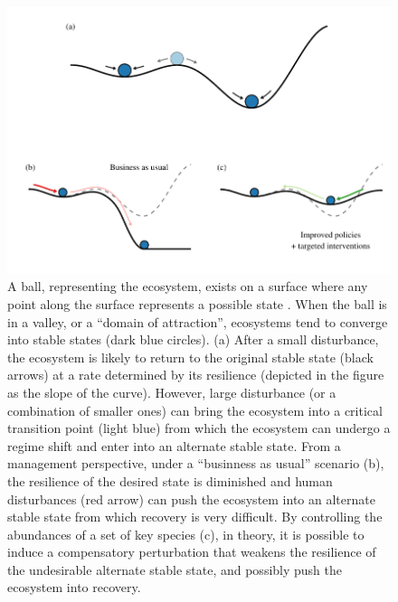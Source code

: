 \documentclass[a4paper]{article}
\begin{document}
\begin{figure}[p]
  \centering
  \includegraphics{critical_tran}
  \caption{
  \label{fig:critical_tran}
  A ball, representing the ecosystem, exists on a surface where any point along the surface represents a possible state \autocite{Holling1995}.
  When the ball is in a valley, or a ``domain of attraction'', ecosystems tend to converge into stable states (dark blue circles).
  (a) After a small disturbance, the ecosystem is likely to return to the original stable state (black arrows) at a rate determined by its resilience (depicted in the figure as the slope of the curve).
  However, large disturbance (or a combination of smaller ones) can bring the ecosystem into a critical transition point (light blue) from which the ecosystem can undergo a regime shift and enter into an alternate stable state.
  From a management perspective, under a ``businness as usual'' scenario (b), the resilience of the desired state is diminished and human disturbances (red arrow) can push the ecosystem into an alternate stable state from which recovery is very difficult.
  By controlling the abundances of a set of key species (c), in theory, it is possible to induce a compensatory perturbation that weakens the resilience of the undesirable alternate stable state, and possibly push the ecosystem into recovery.
  }
\end{figure}
\end{document}
